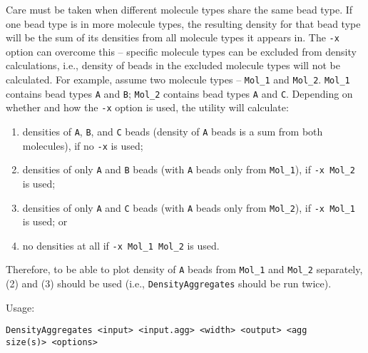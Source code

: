 Care must be taken when different molecule types share the same bead type.
If one bead type is in more molecule types, the resulting density for that
bead type will be the sum of its densities from all molecule types it
appears in. The \texttt{-x} option can overcome this -- specific molecule
types can be excluded from density calculations, i.e., density of beads in
the excluded molecule types will not be calculated.  For example, assume
two molecule types -- \texttt{Mol\_1} and \texttt{Mol\_2}.  \texttt{Mol\_1}
contains bead types \texttt{A} and \texttt{B}; \texttt{Mol\_2} contains
bead types \texttt{A} and \texttt{C}.  Depending on whether and how the
\texttt{-x} option is used, the utility will calculate:
\begin{enumerate}[nosep]
  \item densities of \texttt{A}, \texttt{B}, and \texttt{C} beads (density of
    \texttt{A} beads is a sum from both molecules), if no \texttt{-x} is used;
  \item densities of only \texttt{A} and \texttt{B} beads (with \texttt{A}
    beads only from \texttt{Mol\_1}), if \texttt{-x Mol\_2} is used;
  \item densities of only \texttt{A} and \texttt{C} beads (with \texttt{A}
    beads only from \texttt{Mol\_2}), if \texttt{-x Mol\_1} is used; or
  \item no densities at all if \texttt{-x Mol\_1 Mol\_2} is used.
\end{enumerate}
Therefore, to be able to plot density of \texttt{A} beads from
\texttt{Mol\_1} and \texttt{Mol\_2} separately, (2) and (3) should be used
(i.e., \texttt{DensityAggregates} should be run twice).

Usage:

\vspace{1em}
\noindent
\texttt{DensityAggregates <input> <input.agg> <width> <output> <agg \\
size(s)> <options>}

